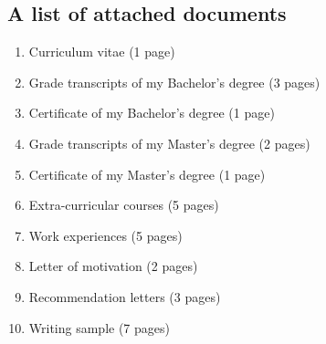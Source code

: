 \documentclass[11pt]{FreemanC}
\begin{document}
\begin{paracol}{2}

\switchcolumn 

\bigskip

\section{A list of attached documents}

\begin{enumerate}
	\item Curriculum vitae (1 page)
	\item Grade transcripts of my Bachelor's degree (3 pages)
	\item Certificate of my Bachelor's degree (1 page)
	\item Grade transcripts of my Master's degree (2 pages)
	\item Certificate of my Master's degree (1 page) 
	\item Extra-curricular courses (5 pages)
	\item Work experiences (5 pages)
	\item Letter of motivation (2 pages) 
	\item Recommendation letters (3 pages) 
	\item Writing sample (7 pages)
\end{enumerate}

\end{paracol}
\end{document}
